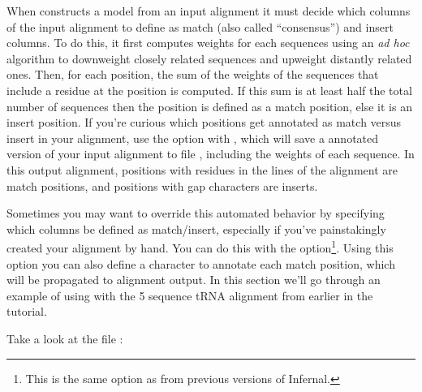 When  constructs a model from an input alignment it must
decide which columns of the input alignment to define as match (also
called ``consensus'') and insert columns. To do this, it first
computes weights for each sequences using an \emph{ad hoc} algorithm
to downweight closely related sequences and upweight distantly related
ones. Then, for each position, the sum of the weights of the sequences
that include a residue at the position is computed. If this sum is at
least half the total number of sequences then the position is defined
as a match position, else it is an insert position. If you're curious
which positions get annotated as match versus insert in your
alignment, use the  option with , which
will save a annotated version of your input alignment to file
, including the weights of each sequence. In this output
alignment, positions with residues in the  lines of
the alignment are match positions, and positions with gap characters
are inserts.

Sometimes you may want to override this automated behavior by
specifying which columns be defined as match/insert, especially if
you've painstakingly created your alignment by hand. You can do this
with the  option\footnote{This is the same option as
   from previous versions of Infernal.}. Using this option
you can also define a character to annotate each match position, which
will be propagated to alignment output. In this section we'll go
through an example of using  with the 5 sequence tRNA
alignment from earlier in the tutorial.

Take a look at the file :

